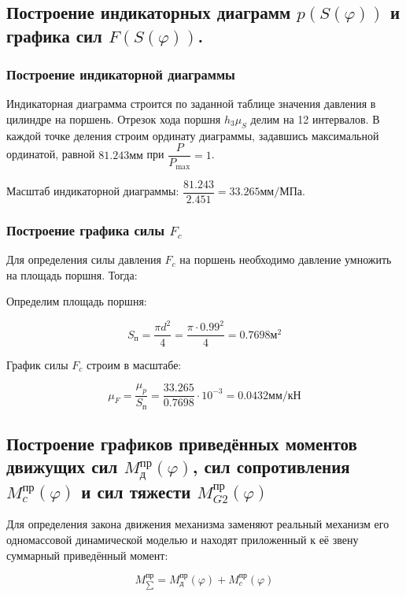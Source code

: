 \subsection{Построение индикаторных диаграмм $p(S(\varphi))$ и графика сил $F(S(\varphi))$.}

\subsubsection{Построение индикаторной диаграммы}
Индикаторная диаграмма строится по заданной таблице значения давления в цилиндре на поршень. Отрезок хода поршня $h_3 \mu_S$ делим на 12 интервалов. В каждой точке деления строим ординату диаграммы, задавшись максимальной ординатой, равной $81.243 мм$ при $ \dfrac{P}{P_{\max}} = 1 $.

Масштаб индикаторной диаграммы: $ \dfrac{81.243}{2.451} = 33.265 мм/МПа$.

\subsubsection{Построение графика силы $F_c$}

Для определения силы давления $F_c$ на поршень необходимо давление умножить на площадь поршня. Тогда:

Определим площадь поршня:

\begin{equation}
	S_п = \dfrac{\pi d^2}{4} = \dfrac{\pi \cdot 0.99^2}{4} = 0.7698 м^2
\end{equation}

График силы $F_c$ строим в масштабе:

\begin{equation}
	\mu_F = \dfrac{\mu_p}{S_п} = \dfrac{33.265}{0.7698} \cdot 10^{-3} = 0.0432 мм/кН 
\end{equation}

\subsection{Построение графиков приведённых моментов движущих сил $ M_д^{пр}(\varphi) $, сил сопротивления $ M_c^{пр}(\varphi) $ и сил тяжести $ M_{G2}^{пр}(\varphi) $}

Для определения закона движения механизма заменяют реальный механизм его одномассовой динамической моделью и находят приложенный к её звену суммарный приведённый момент:

\begin{equation}
	M_{\sum}^{пр} =  M_д^{пр}(\varphi) +  M_c^{пр}(\varphi) 
\end{equation}

